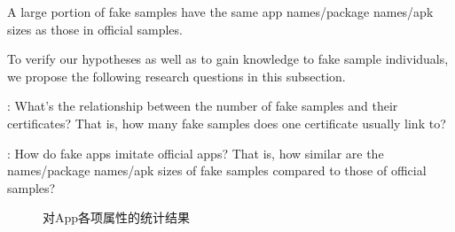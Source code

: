  A large portion of fake samples have the same app names/package names/apk sizes as those in official samples.

To verify our hypotheses as well as to gain knowledge to fake sample individuals, we propose the following research questions in this subsection.

: What's the relationship between the number of fake samples and their certificates? That is, how many fake samples does one certificate usually link to?

: How do fake apps imitate official apps? That is, how similar are the names/package names/apk sizes of fake samples compared to those of official samples?

\begin{figure}[htbp]
	\centering
    \hfill
    \hfill
    \hfill
	\caption{对App各项属性的统计结果}
	\label{fig:Statistic_fake_and_official}
	\vspace{-5mm}
\end{figure}

